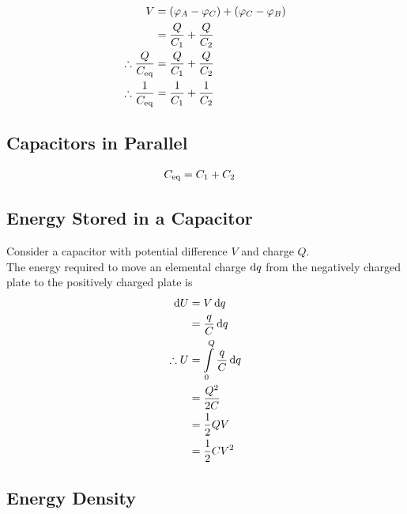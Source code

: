\documentclass[fleqn, a4paper, 12pt, twoside]{article}
\theoremstyle{definition}
\theoremstyle{theorem}
\begin{document}
\begin{align*}
	           V                              &= (\varphi_A - \varphi_C) + (\varphi_C - \varphi_B)\\
	                                          &= \dfrac{Q}{C_1} + \dfrac{Q}{C_2}\\
	\therefore \dfrac{Q}{C_{\textnormal{eq}}} &= \dfrac{Q}{C_1} + \dfrac{Q}{C_2}\\
	\therefore \dfrac{1}{C_{\textnormal{eq}}} &= \dfrac{1}{C_1} + \dfrac{1}{C_2}
\end{align*}

\subsection{Capacitors in Parallel}

\begin{align*}
	C_{\textnormal{eq}} &= C_1 +C_2
\end{align*}

\subsection{Energy Stored in a Capacitor}

Consider a capacitor with potential difference $V$ and charge $Q$.\\
The energy required to move an elemental charge $\dif q$ from the negatively charged plate to the positively charged plate is
\begin{align*}
	           \dif U &= V \dif q\\
	                  &= \dfrac{q}{C} \dif q\\
	\therefore U      &= \int\limits_{0}^{Q} \dfrac{q}{C} \dif q\\
	                  &= \dfrac{Q^2}{2 C}\\
			  &= \dfrac{1}{2} Q V\\
			  &= \dfrac{1}{2} C V^2
\end{align*}

\subsection{Energy Density}
\end{document}
